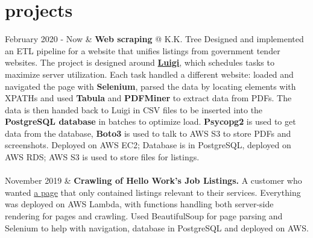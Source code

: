 \documentclass[]{cv-roald}
\begin{document}
                    
    

\section*{projects}
\begin{tabularcv}
    February 2020 - Now &       \textbf{Web scraping} @ K.K. Tree\newline 
                                Designed and implemented an ETL pipeline for a website that unifies listings from government tender websites.
                                The project is designed around \href{https://luigi.readthedocs.io/en/stable/}{\textbf{Luigi}}, which schedules tasks to maximize server utilization. Each task handled a different website: loaded and navigated the page with \textbf{Selenium}, parsed the data by locating elements with XPATHs and used \textbf{Tabula} and \textbf{PDFMiner} to extract data from PDFs. The data is then handed back to Luigi in CSV files to be inserted into the \textbf{PostgreSQL database} in batches to optimize load. \textbf{Psycopg2} is used to get data from the database, \textbf{Boto3} is used to talk to AWS S3 to store PDFs and screenshots.
                                \newline Deployed on AWS EC2; Database is in PostgreSQL, deployed on AWS RDS; AWS S3 is used to store files for listings.
    \\[\vspacepar]
    \\[\vspacepar]

    November 2019 &             \textbf{Crawling of Hello Work's Job Listings.}\newline 
                                A customer who wanted \href{https://www.oshigoto-shokai.jp/}{a page} that only contained listings relevant to their services. \newline 
                                Everything was deployed on AWS Lambda, with functions handling both server-side rendering for pages and crawling. Used BeautifulSoup for page parsing and Selenium to help with navigation, database in PostgreSQL and deployed on AWS.
    \\[\vspacepar]
    

\end{tabularcv}
\end{document}
